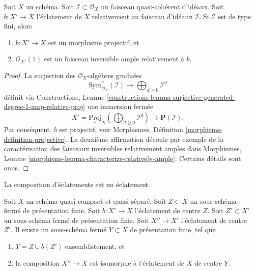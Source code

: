\begin{lemma}
\label{lemma-blowing-up-projective}
Soit  $X$  un schéma. Soit  $\mathcal{I} \subset \mathcal{O}_X$  un faisceau quasi-cohérent
d'idéaux. Soit  $b : X' \to X$  l'éclatement de  $X$  relativement au faisceau d'idéaux
 $\mathcal{I}$. Si  $\mathcal{I}$  est de type fini, alors
\begin{enumerate}
\item $b : X' \to X$  est un morphisme projectif, et
\item $\mathcal{O}_{X'}(1)$  est un faisceau inversible ample relativement à  $b$.
\end{enumerate}
\end{lemma}

\begin{proof}
La surjection des  $\mathcal{O}_X$-algèbres graduées
$$
\text{Sym}_{\mathcal{O}_X}^*(\mathcal{I})
\longrightarrow
\bigoplus\nolimits_{d \geq 0} \mathcal{I}^d
$$
définit via Constructions, Lemme  \ref{constructions-lemma-surjective-generated-degree-1-map-relative-proj}  une immersion fermée
$$
X' = \underline{\text{Proj}}_X (\bigoplus\nolimits_{d \geq 0} \mathcal{I}^d)
\longrightarrow
\mathbf{P}(\mathcal{I}).
$$
Par conséquent,  $b$  est projectif, voir Morphismes, Définition
 \ref{morphisms-definition-projective}. La deuxième affirmation découle par exemple de la caractérisation
des faisceaux inversibles relativement amples dans Morphismes, Lemme  \ref{morphisms-lemma-characterize-relatively-ample}.
Certains détails sont omis.
\end{proof}

\begin{lemma}
\label{lemma-composition-finite-type-blowups}
\begin{slogan}
La composition d'éclatements est un éclatement.
\end{slogan}
Soit  $X$  un schéma quasi-compact et quasi-séparé. Soit  $Z \subset X$  un
sous-schéma fermé de présentation finie. Soit  $b : X' \to X$  l’éclatement de centre
 $Z$. Soit  $Z' \subset X'$  un sous-schéma fermé de présentation finie. Soit
 $X'' \to X'$  l’éclatement de centre  $Z'$. Il existe un sous-schéma fermé
 $Y \subset X$  de présentation finie, tel que
\begin{enumerate}
\item $Y = Z \cup b(Z')$  ensemblistement, et
\item la composition  $X'' \to X$  est isomorphe à l'éclatement de  $X$  de centre
 $Y$.
\end{enumerate}
\end{lemma}

